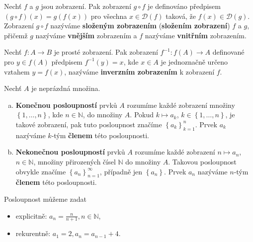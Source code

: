 \begin{definice}
	Nechť $f$ a $g$ jsou zobrazení. Pak zobrazení $g\circ f$ je definováno předpisem
	$(g\circ f)(x)=g(f(x))$ pro všechna $x \in \mathcal D(f)$ taková, že $f(x)\in \mathcal D(g)$. Zobrazení
	$g\circ f$ nazýváme \textbf{složeným zobrazením} (\textbf{složením zobrazení}) $f$ a $g$, přičemž
$g$ nazýváme \textbf{vnějším} zobrazením a $f$ nazýváme \textbf{vnitřním} zobrazením.
\end{definice}

\begin{definice}
	Nechť $f:A\to B$ je prosté zobrazení. Pak zobrazení $f^{-1}:f(A)\to A$ definované pro $y\in f(A)$ předpisem $f^{-1}(y)=x$, kde $x\in A$ je jednoznačně určeno vztahem $y=f(x)$, nazýváme \textbf{inverzním zobrazením} k zobrazení $f$.
\end{definice}

\begin{definice}
	Nechť $A$ je neprázdná množina.
	\begin{enumerate}[(a)]
		\item \textbf{Konečnou posloupností} prvků $A$ rozumíme každé zobrazení množiny $\left \{ 1,\dots, n \right \} $, kde
		$n \in \mathbb N $, do množiny $A$. Pokud $k\mapsto a_k$, $k\in \left \{ 1,\dots, n \right \} $, je takové zobrazení,
		pak tuto posloupnost značíme $\left \{ a_k \right \}_{k=1}^n $. Prvek $a_k$ nazýváme $k$-tým \textbf{členem} této posloupnosti.
		\item \textbf{Nekonečnou posloupností} prvků $A$ rozumíme každé zobrazení $n\mapsto a_n$, $n\in \mathbb N $,
		množiny přirozených čísel $\mathbb N $ do množiny $A$. Takovou posloupnost
		obvykle značíme $\left \{ a_n \right \}_{n=1}^\infty $, případně jen $\left \{ a_n \right \} $. Prvek $a_n$
		nazýváme $n$-tým \textbf{členem} této posloupnosti.
	\end{enumerate}
\end{definice}

\begin{poznamka}
	Posloupnost můžeme zadat
	\begin{itemize}
		\item explicitně: $a_n=\frac{n}{n+1}, n\in \mathbb N $,
		\item rekurentně: $a_1 = 2, a_n = a_{n-1} +4$.
\end{itemize}
\end{poznamka}

